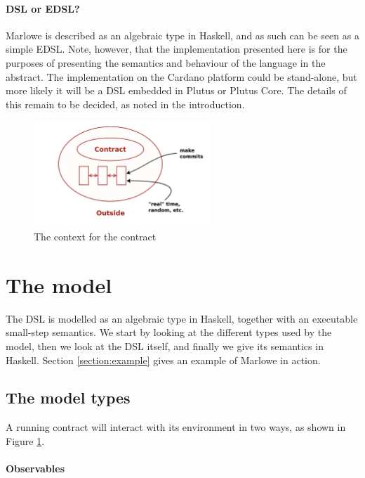 \documentclass[
      acmsmall
    , screen
    , review=true
  ]{acmart}
\begin{document}
\paragraph{DSL or EDSL?}

Marlowe is described as an algebraic  type in Haskell, and as such can be seen as a simple EDSL. Note, however, that the implementation presented here is for the purposes of presenting the semantics and behaviour of the language in the abstract. The implementation on the Cardano platform could be stand-alone, but more likely it will be a DSL embedded in Plutus or Plutus Core. The details of this remain to be decided, as noted in the introduction.

\begin{figure}[t]
\begin{center}
\includegraphics[width=0.6\textwidth]{pix/context.png}
\caption{The context for the contract}
\label{fig:context}
\end{center}
\end{figure}


\section{The model}
\label{section:model}

The DSL is modelled as an algebraic type in Haskell, together with an executable small-step semantics. 
We start by looking at the different types used by the model, then we look at the  DSL itself, and finally we give its semantics in Haskell. Section \ref{section:example} gives an example of Marlowe in action.

\subsection{The model types}

A running contract will interact with its environment in two ways, as shown in Figure \ref{fig:context}.

\paragraph{Observables}
\end{document}
